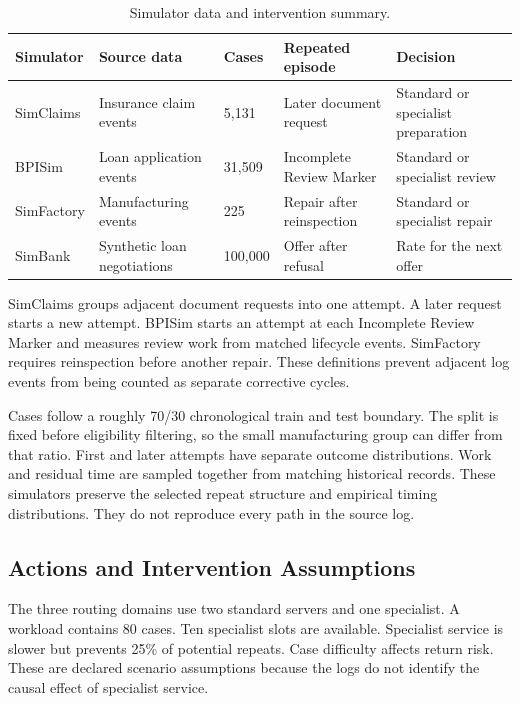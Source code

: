 \documentclass[conference]{IEEEtran}
\begin{document}
\begin{table}[!tb]
\caption{Simulator data and intervention summary.}
\label{tab:data}
\centering\footnotesize
\setlength{\tabcolsep}{5pt}
\renewcommand{\arraystretch}{1.12}
\begin{tabularx}{\textwidth}{@{}L{.68in}L{1.55in}L{.61in}Y Y@{}}
\toprule
Simulator & Source data & Cases & Repeated episode & Decision \\
\midrule
SimClaims & Insurance claim events \cite{levich} & 5,131 & Later document request & Standard or specialist preparation \\
BPISim & Loan application events \cite{bpi} & 31,509 & Incomplete Review Marker & Standard or specialist review \\
SimFactory & Manufacturing events \cite{production} & 225 & Repair after reinspection & Standard or specialist repair \\
SimBank & Synthetic loan negotiations \cite{simbank} & 100,000 & Offer after refusal & Rate for the next offer \\
\bottomrule
\end{tabularx}
\end{table}

SimClaims groups adjacent document requests into one attempt. A later request starts a new attempt. BPISim starts an attempt at each Incomplete Review Marker and measures review work from matched lifecycle events. SimFactory requires reinspection before another repair. These definitions prevent adjacent log events from being counted as separate corrective cycles.

Cases follow a roughly 70/30 chronological train and test boundary. The split is fixed before eligibility filtering, so the small manufacturing group can differ from that ratio. First and later attempts have separate outcome distributions. Work and residual time are sampled together from matching historical records. These simulators preserve the selected repeat structure and empirical timing distributions. They do not reproduce every path in the source log.

\subsection{Actions and Intervention Assumptions}

The three routing domains use two standard servers and one specialist. A workload contains 80 cases. Ten specialist slots are available. Specialist service is slower but prevents 25\% of potential repeats. Case difficulty affects return risk. These are declared scenario assumptions because the logs do not identify the causal effect of specialist service.
\end{document}
